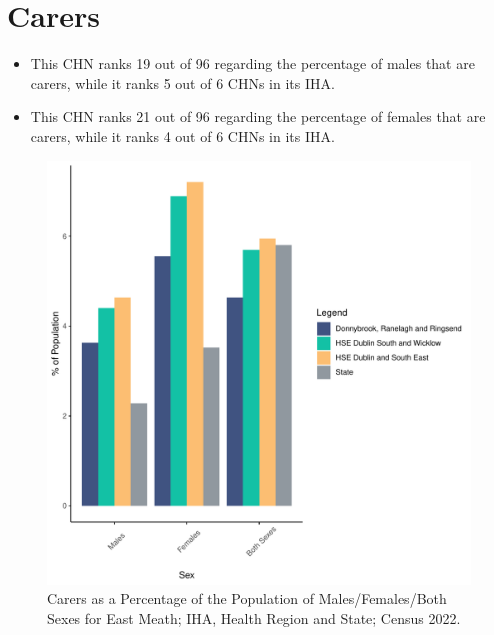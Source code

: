 \documentclass{article}
\begin{document}
\section{Carers}\label{sect:Carers}
\begin{itemize}
\item This CHN ranks  19 out of 96 regarding the percentage of males that are carers, while it ranks   5 out of 6 CHNs in its IHA.
\item This CHN ranks  21 out of 96 regarding the percentage of females that are carers, while it ranks   4 out of 6 CHNs in its IHA.
\end{itemize}
\begin{figure}[H]
	\centering
	\includegraphics[width = 150mm]{../figures/CareED.pdf}
	\caption{Carers as a Percentage of the Population of Males/Females/Both Sexes for East Meath; IHA, Health Region and State; Census 2022.}
	\label{fig:2ae19629-1a6a-13a3-e055-000000000001}
	\end{figure}
\end{document}
